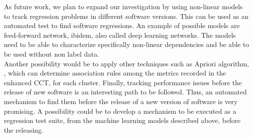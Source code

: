 As future work, we plan to expand our investigation by using non-linear models to track regression problems in different software versions\cite{deep}. This can be used as an automated test to find software regressions. An example of possible models are feed-forward network, ibidem, also called deep learning networks.
The models need to be able to characterize specifically non-linear dependencies and be able to be used without non label data.\\ 

Another possibility would be to apply other techniques such as Apriori algorithm, \cite{apriori}, which can determine association rules among the metrics recorded in the enhanced CCT, for each cluster. Finally, tracking performance issues before the release of new software is an interesting path to be followed. Thus, an automated mechanism to find them before the release of a new version of software is very promising. A possibility could be to develop a mechanism to be executed as a regression test suite, from the machine learning models described above, before the releasing.


